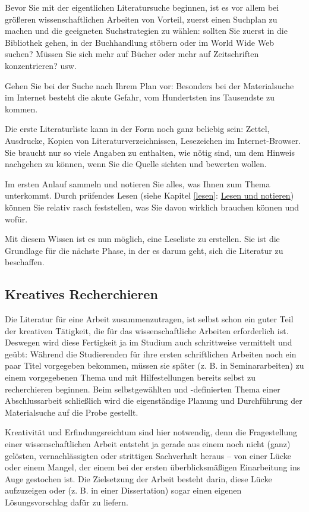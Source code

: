 \documentclass[]{book}
\theoremstyle{definition}
\theoremstyle{definition}
\theoremstyle{definition}
\theoremstyle{remark}
\begin{document}
Bevor Sie mit der eigentlichen Literatursuche beginnen, ist es vor allem
bei größeren wissenschaftlichen Arbeiten von Vorteil, zuerst einen
Suchplan zu machen und die geeigneten Suchstrategien zu wählen: sollten
Sie zuerst in die Bibliothek gehen, in der Buchhandlung stöbern oder im
World Wide Web suchen? Müssen Sie sich mehr auf Bücher oder mehr auf
Zeitschriften konzentrieren? usw.

Gehen Sie bei der Suche nach Ihrem Plan vor: Besonders bei der
Materialsuche im Internet besteht die akute Gefahr, vom Hundertsten ins
Tausendste zu kommen.

Die erste Literaturliste kann in der Form noch ganz beliebig sein:
Zettel, Ausdrucke, Kopien von Literaturverzeichnissen, Lesezeichen im
Internet-Browser. Sie braucht nur so viele Angaben zu enthalten, wie
nötig sind, um dem Hinweis nachgehen zu können, wenn Sie die Quelle
sichten und bewerten wollen.

Im ersten Anlauf sammeln und notieren Sie alles, was Ihnen zum Thema
unterkommt. Durch prüfendes Lesen (siehe Kapitel \ref{lesen}:
\protect\hyperlink{lesen}{Lesen und notieren}) können Sie relativ rasch
feststellen, was Sie davon wirklich brauchen können und wofür.

Mit diesem Wissen ist es nun möglich, eine Leseliste zu erstellen. Sie
ist die Grundlage für die nächste Phase, in der es darum geht, sich die
Literatur zu beschaffen.

\subsection{Kreatives Recherchieren}\label{kreatives-recherchieren}

Die Literatur für eine Arbeit zusammenzutragen, ist selbst schon ein
guter Teil der kreativen Tätigkeit, die für das wissenschaftliche
Arbeiten erforderlich ist. Deswegen wird diese Fertigkeit ja im Studium
auch schrittweise vermittelt und geübt: Während die Studierenden für
ihre ersten schriftlichen Arbeiten noch ein paar Titel vorgegeben
bekommen, müssen sie später (z. B. in Seminararbeiten) zu einem
vorgegebenen Thema und mit Hilfestellungen bereits selbst zu
recherchieren beginnen. Beim selbstgewählten und -definierten Thema
einer Abschlussarbeit schließlich wird die eigenständige Planung und
Durchführung der Materialsuche auf die Probe gestellt.

Kreativität und Erfindungsreichtum sind hier notwendig, denn die
Fragestellung einer wissenschaftlichen Arbeit entsteht ja gerade aus
einem noch nicht (ganz) gelösten, vernachlässigten oder strittigen
Sachverhalt heraus -- von einer Lücke oder einem Mangel, der einem bei
der ersten überblicksmäßigen Einarbeitung ins Auge gestochen ist. Die
Zielsetzung der Arbeit besteht darin, diese Lücke aufzuzeigen oder (z.
B. in einer Dissertation) sogar einen eigenen Lösungsvorschlag dafür zu
liefern.
\end{document}
